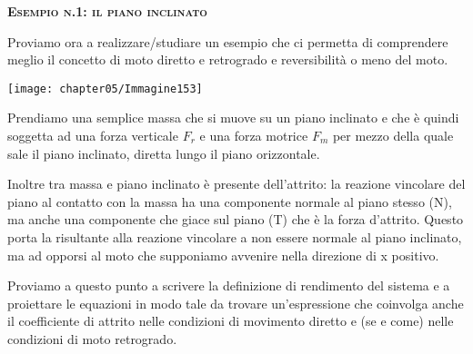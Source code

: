 \begin{center}
{\scshape{\bfseries Esempio n.1: il piano inclinato}}
\end{center}

Proviamo ora a realizzare/studiare un esempio che ci permetta di comprendere meglio il concetto di moto diretto e retrogrado e reversibilità o meno del moto.

\begin{minipage}{.5\textwidth}
\centering
\texttt{[image: chapter05/Immagine153]}
\end{minipage}
\hfill
\begin{minipage}{.5\textwidth}
Prendiamo una semplice massa che si muove su un piano inclinato e che è quindi soggetta ad una forza verticale $F_r$ e una forza motrice $F_m$ per mezzo della quale sale il piano inclinato, diretta lungo il piano orizzontale.

Inoltre tra massa e piano inclinato è presente dell'attrito: la reazione vincolare del piano al contatto con la massa ha una componente normale al piano stesso (N), ma anche una componente che giace sul piano (T) che è la forza d'attrito. Questo porta la risultante alla reazione vincolare a non essere normale al piano inclinato, ma ad opporsi al moto che supponiamo avvenire nella direzione di x positivo.
\end{minipage}

Proviamo a questo punto a scrivere la definizione di rendimento del sistema e a proiettare le equazioni in modo tale da trovare un'espressione che coinvolga anche il coefficiente di attrito nelle condizioni di movimento diretto e (se e come) nelle condizioni di moto retrogrado.

